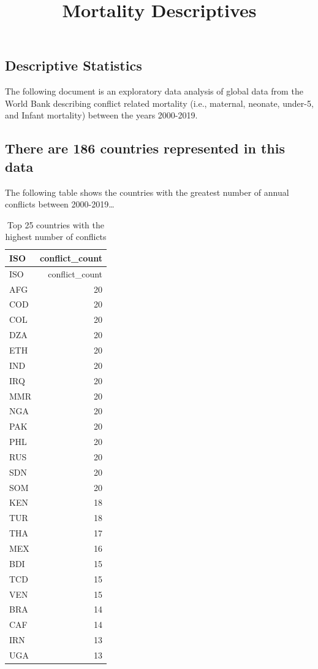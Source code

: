 \documentclass[
  letterpaper,
  DIV=11,
  numbers=noendperiod]{scrartcl}
\title{Mortality Descriptives}
\author{}
\date{}
\begin{document}
\maketitle


\subsection{Descriptive Statistics}\label{descriptive-statistics}

The following document is an exploratory data analysis of global data
from the World Bank describing conflict related mortality (i.e.,
maternal, neonate, under-5, and Infant mortality) between the years
2000-2019.

\subsection{There are 186 countries represented in this
data}\label{there-are-186-countries-represented-in-this-data}

The following table shows the countries with the greatest number of
annual conflicts between 2000-2019\ldots{}

\begin{longtable}[]{@{}lr@{}}
\caption{Top 25 countries with the highest number of
conflicts}\tabularnewline
\toprule\noalign{}
ISO & conflict\_count \\
\midrule\noalign{}
\endfirsthead
\toprule\noalign{}
ISO & conflict\_count \\
\midrule\noalign{}
\endhead
\bottomrule\noalign{}
\endlastfoot
AFG & 20 \\
COD & 20 \\
COL & 20 \\
DZA & 20 \\
ETH & 20 \\
IND & 20 \\
IRQ & 20 \\
MMR & 20 \\
NGA & 20 \\
PAK & 20 \\
PHL & 20 \\
RUS & 20 \\
SDN & 20 \\
SOM & 20 \\
KEN & 18 \\
TUR & 18 \\
THA & 17 \\
MEX & 16 \\
BDI & 15 \\
TCD & 15 \\
VEN & 15 \\
BRA & 14 \\
CAF & 14 \\
IRN & 13 \\
UGA & 13 \\
\end{longtable}
\end{document}

